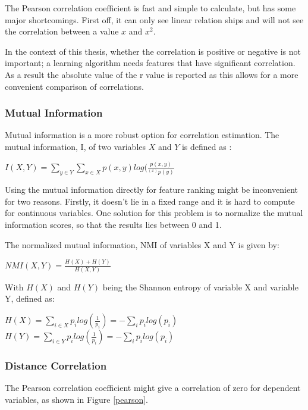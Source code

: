 \npar

The Pearson correlation coefficient is fast and simple to calculate, but has some major shortcomings. First off, it can only see linear relation ships and will not see the correlation between a value $x$ and $x^2$.

\npar

In the context of this thesis, whether the correlation is positive or negative is not important; a learning algorithm needs features that have significant correlation. As a result the absolute value of the r value is reported as this allows for a more convenient comparison of correlations.

\subsubsection{Mutual Information}
Mutual information is a more robust option for correlation estimation. The mutual information, I, of two variables $X$ and $Y$ is defined as \citep{mutPaper}:
\begin{center}
$I(X,Y) = \sum\limits_{y\in Y} \sum\limits_{x\in X} p(x,y)log(\frac{p(x,y)}{^(x)p(y)}$
\end{center}

\npar

Using the mutual information directly for feature ranking might be inconvenient for two reasons. Firstly, it doesn't lie in a fixed range and it is hard to compute for continuous variables. One solution for this problem is to normalize the mutual information scores, so that the results lies between 0 and 1.

The normalized mutual information, NMI of variables X and Y is given by:
\begin{center}
$NMI(X,Y) = \frac{H(X) + H(Y)}{H(X,Y)}$
\end{center}
With $H(X)$ and $H(Y)$ being the Shannon entropy of variable X and variable Y, defined as:
\begin{center}
$H(X) = \sum\limits_{i\in X} p_ilog(\frac{1}{p_i}) = - \sum\limits_i p_ilog(p_i)$\\
$H(Y) = \sum\limits_{i\in Y} p_ilog(\frac{1}{p_i}) = - \sum\limits_i p_ilog(p_i)$
\end{center}
\npar

\subsubsection{Distance Correlation}
The Pearson correlation coefficient might give a correlation of zero for dependent variables, as shown in Figure \ref{pearson}.

